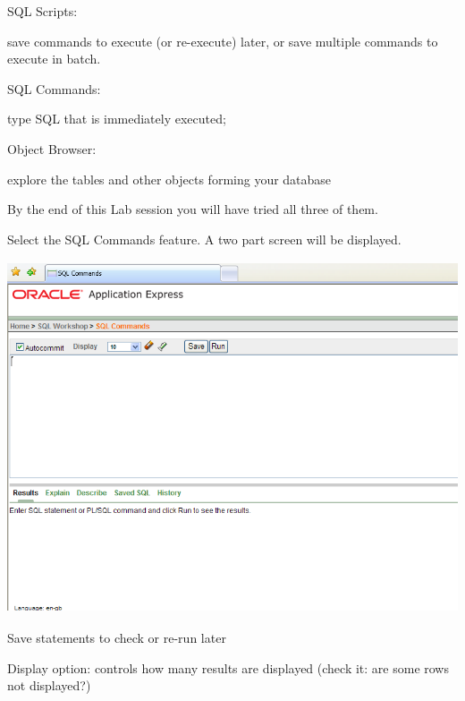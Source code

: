 \begin{center}
\begin{minipage}{6.368cm}
SQL Scripts:

save commands to execute (or re-execute) later, or save multiple commands to execute in batch.
\end{minipage}
\end{center}
\begin{center}
\begin{minipage}{4.189cm}
SQL Commands: 

type SQL that is immediately executed;
\end{minipage}
\end{center}
\begin{center}
\begin{minipage}{3.981cm}
Object Browser:

explore the tables and other objects forming your database
\end{minipage}
\end{center}
By the end of this Lab session you will have tried all three of them.

Select the SQL Commands feature. A two part screen will be displayed.

\begin{center}
  
\includegraphics[width=13.728cm,height=10.4cm]{images/img (7).png}

\end{center}


\begin{center}
\begin{minipage}{4.584cm}
Save statements to check or re-run later
\end{minipage}
\end{center}
\begin{center}
\begin{minipage}{4.246cm}
Display option:  controls how many results are displayed (check it: are some rows not displayed?)
\end{minipage}
\end{center}


